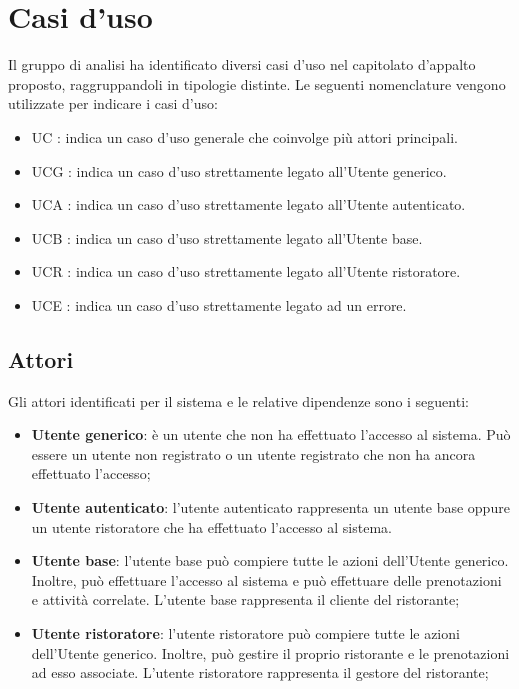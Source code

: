 \section{Casi d'uso}

Il gruppo di analisi ha identificato diversi casi d'uso nel capitolato d'appalto proposto, raggruppandoli in tipologie distinte. 
Le seguenti nomenclature vengono utilizzate per indicare i casi d'uso:

\begin{itemize}
	\item UC : indica un caso d'uso generale che coinvolge più attori principali.
	\item UCG : indica un caso d'uso strettamente legato all'Utente generico.
	\item UCA : indica un caso d'uso strettamente legato all'Utente autenticato.
	\item UCB : indica un caso d'uso strettamente legato all'Utente base.
	\item UCR : indica un caso d'uso strettamente legato all'Utente ristoratore.
	\item UCE : indica un caso d'uso strettamente legato ad un errore.
\end{itemize}

\subsection{Attori}

Gli attori identificati per il sistema e le relative dipendenze sono i seguenti:
\begin{itemize}
	\item \textbf{Utente generico}: è un utente che non ha effettuato l'accesso al
	      sistema. Può essere un utente non registrato o un utente registrato che non ha
	      ancora effettuato l'accesso;

	\item \textbf{Utente autenticato}: l'utente autenticato rappresenta un utente
	      base oppure un utente ristoratore che ha effettuato l'accesso al sistema.

	\item \textbf{Utente base}: l'utente base può compiere tutte le azioni
	      dell'Utente generico. Inoltre, può effettuare l'accesso al sistema e può
	      effettuare delle prenotazioni e attività correlate. L'utente base rappresenta
	      il cliente del ristorante;

	\item \textbf{Utente ristoratore}: l'utente ristoratore può compiere tutte le
	      azioni dell'Utente generico. Inoltre, può gestire il proprio ristorante e le
	      prenotazioni ad esso associate. L'utente ristoratore rappresenta il gestore del
	      ristorante;
\end{itemize}
